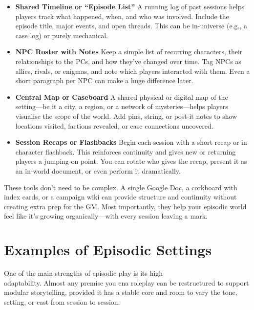 \begin{itemize}
    \item \textbf{Shared Timeline or “Episode List”}  
    A running log of past sessions helps players track what happened, when, and who was involved. Include the episode title, major events, and open threads. This can be in-universe (e.g., a case log) or purely mechanical.

    \item \textbf{NPC Roster with Notes}  
    Keep a simple list of recurring characters, their relationships to the PCs, and how they’ve changed over time. Tag NPCs as allies, rivals, or enigmas, and note which players interacted with them. Even a short paragraph per NPC can make a huge difference later.

    \item \textbf{Central Map or Caseboard}  
    A shared physical or digital map of the setting—be it a city, a region, or a network of mysteries—helps players visualise the scope of the world. Add pins, string, or post-it notes to show locations visited, factions revealed, or case connections uncovered.

    \item \textbf{Session Recaps or Flashbacks}  
    Begin each session with a short recap or in-character flashback. This reinforces continuity and gives new or returning players a jumping-on point. You can rotate who gives the recap, present it as an in-world document, or even perform it dramatically.
\end{itemize}

These tools don't need to be complex. A single Google Doc, a corkboard with index cards, or a campaign wiki can provide structure and continuity without creating extra prep for the GM. Most importantly, they help your episodic world feel like it’s growing organically—with every session leaving a mark.



\section{Examples of Episodic Settings}

One of the main strengths of episodic play is its high\\ adaptability. Almost any premise you cna roleplay can be restructured to support modular storytelling, provided it has a stable core and room to vary the tone, setting, or cast from session to session.

